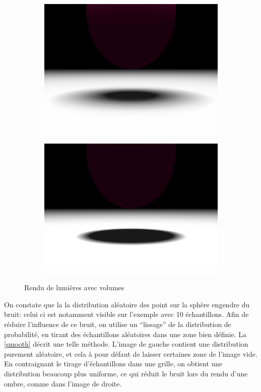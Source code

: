 \documentclass{article}
\begin{document}
\begin{figure}[hb]
  \begin{subfigure}{0.45\textwidth}
    \includegraphics[width=1\textwidth]{images/samples100r2.png}
  \end{subfigure}
  \begin{subfigure}{0.45\textwidth}
    \includegraphics[width=1\textwidth]{images/samples100r05.png}
  \end{subfigure}
  \caption{Rendu de lumières avec volumes\label{light}}
\end{figure}

On constate que la la distribution aléatoire des point sur la sphère engendre
du bruit: celui ci est notamment visible sur l'exemple avec 10 échantillons.
Afin de réduire l'influence de ce bruit, on utilise un ``lissage'' de la
distribution de probabilité, en tirant des échantillons aléatoires dans une
zone bien définie. La \cref{smooth} décrit une telle méthode. L'image de
gauche contient une distribution purement aléatoire, et cela à pour défaut de
laisser certaines zone de l'image vide. En contraignant le tirage
d'échantillons dans une grille, on obtient une distribution beaucoup plus
uniforme, ce qui réduit le bruit lors du rendu d'une ombre, comme dans l'image
de droite.
\end{document}
